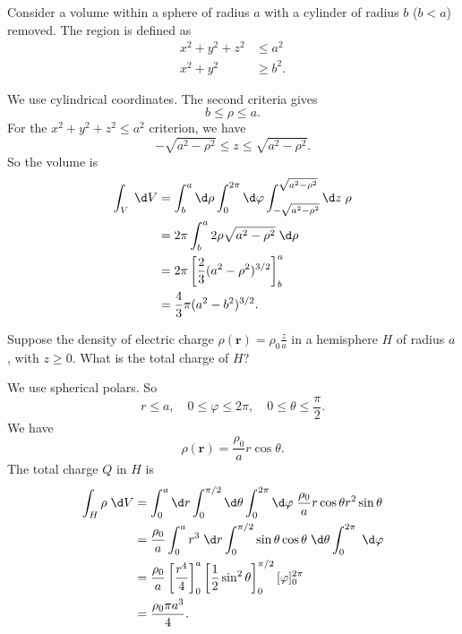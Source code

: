 \documentclass[a4paper]{article}
\begin{document}
\begin{eg}
  Consider a volume within a sphere of radius $a$ with a cylinder of radius $b$ ($b < a$) removed. The region is defined as
  \begin{align*}
    x^2 + y^2 + z^2 &\leq a^2\\
    x^2 + y^2 &\geq b^2.
  \end{align*}
  \begin{center}
  \end{center}
  We use cylindrical coordinates. The second criteria gives
  \[
    b \leq \rho \leq a.
  \]
  For the $x^2 + y^2 + z^2 \leq a^2$ criterion, we have
  \[
    -\sqrt{a^2 - \rho^2} \leq z \leq \sqrt{a^2 - \rho^2}.
  \]
  So the volume is
  \begin{align*}
    \int_V \;\d V &= \int_b^a\d \rho\int_0^{2\pi}\d \varphi \int_{-\sqrt{a^2 - \rho^2}}^{\sqrt{a^2 - \rho^2}}\d z\; \rho\\
    &= 2\pi\int_b^a 2\rho\sqrt{a^2 - \rho^2}\;\d \rho\\
    &= 2\pi \left[\frac{2}{3}(a^2 - \rho^2)^{3/2}\right]^a_b\\
    &= \frac{4}{3}\pi (a^2 - b^2)^{3/2}.
  \end{align*}
\end{eg}
\begin{eg}
  Suppose the density of electric charge $\rho(\mathbf{r}) = \rho_0 \frac{z}{a}$ in a hemisphere $H$ of radius $a$, with $z \geq 0$. What is the total charge of $H$?

  We use spherical polars. So
  \[
    r \leq a,\quad 0 \leq \varphi \leq 2\pi,\quad 0 \leq \theta \leq \frac{\pi}{2}.
  \]
  We have
  \[
    \rho(\mathbf{r}) = \frac{\rho_0}{a}r\cos \theta.
  \]
  The total charge $Q$ in $H$ is
  \begin{align*}
    \int_H \rho \;\d V &= \int_0^a\d r\int_0^{\pi/2}\d \theta\int_0^{2\pi}\d\varphi\; \frac{\rho_0}{a}r\cos\theta r^2\sin\theta\\
    &= \frac{\rho_0}{a}\int_0^a r^3 \;\d r \int_0^{\pi/2}\sin\theta \cos\theta\;\d \theta \int_0^{2\pi}\;\d \varphi\\
    &= \frac{\rho_0}{a}\left[\frac{r^4}{4}\right]^a_0\left[\frac{1}{2}\sin^2\theta\right]^{\pi/2}_0 [\varphi]^{2\pi}_0\\
    &= \frac{\rho_0 \pi a^3}{4}.
  \end{align*}
\end{eg}
\end{document}
